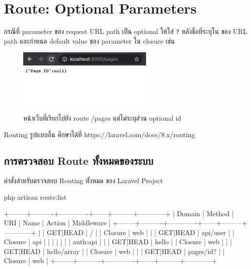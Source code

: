 \section{Route: Optional Parameters}

กรณีที่ parameter ของ request URL path เป็น optional ให้ใส่ \texttt{?} หลังชื่อที่ระบุใน \texttt{{}} 
ของ URL path และกำหนด default value ของ parameter ใน closure เช่น


\newpage

\begin{figure}[h!]
    \centering
    \includegraphics[width=0.6\textwidth]{images/ch3/07.png}
    \caption{หน้าเว็บที่เรียกไปยัง route /pages แต่ไม่ระบุส่วน optional id}
\end{figure}

Routing รูปแบบอื่น ศึกษาได้ที่ https://laravel.com/docs/8.x/routing

\subsection{การตรวจสอบ Route ทั้งหมดของระบบ}

คำสั่งสำหรับตรวจสอบ Routing ทั้งหมด ของ Laravel Project

\begin{cli}{}
    php artisan route:list
\end{cli}

\begin{out}{}
+--------+----------+-------------+------+---------+------------+
| Domain | Method   | URI         | Name | Action  | Middleware |
+--------+----------+-------------+------+---------+------------+
|        | GET|HEAD | /           |      | Closure | web        |
|        | GET|HEAD | api/user    |      | Closure | api        |
|        |          |             |      |         | auth:api   |
|        | GET|HEAD | hello       |      | Closure | web        |
|        | GET|HEAD | hello/array |      | Closure | web        |
|        | GET|HEAD | pages/{id?} |      | Closure | web        |
+--------+----------+-------------+------+---------+------------+
\end{out}